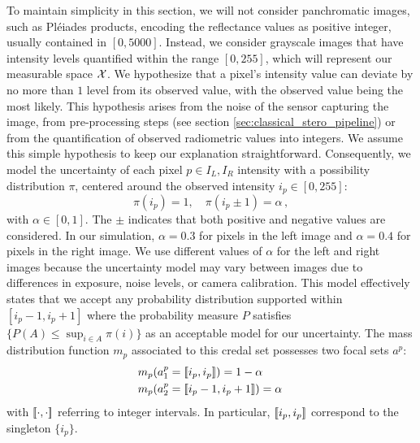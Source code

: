 To maintain simplicity in this section, we will not consider panchromatic images, such as Pléiades products, encoding the reflectance values as positive integer, usually contained in $[0, 5000]$. Instead, we consider grayscale images that have intensity levels quantified within the range $[0, 255]$, which will represent our measurable space ${\mathcal{X}}$. We hypothesize that a pixel's intensity value can deviate by no more than $1$ level from its observed value, with the observed value being the most likely. This hypothesis arises from the noise of the sensor capturing the image, from pre-processing steps (see section \ref{sec:classical_stero_pipeline}) or from the quantification of observed radiometric values into integers. We assume this simple hypothesis to keep our explanation straightforward. Consequently, we model the uncertainty of each pixel $p\in I_L,I_R$ intensity with a possibility distribution $\pi$, centered around the observed intensity $i_p\in[0,255]$:
\begin{equation}
    \pi(i_p)=1,\quad \pi(i_p\pm1)=\alpha\,,
\end{equation}\label{eq:pixel_possibility}
with $\alpha \in [0,1]$. The $\pm$ indicates that both positive and negative values are considered. In our simulation, $\alpha = 0.3$ for pixels in the left image and $\alpha = 0.4$ for pixels in the right image. We use different values of $\alpha$ for the left and right images because the uncertainty model may vary between images due to differences in exposure, noise levels, or camera calibration. This model effectively states that we accept any probability distribution supported within $[i_p - 1, i_p + 1]$ where the probability measure $P$ satisfies $\{P(A) \leq \sup_{i \in A} \pi(i)\}$ as an acceptable model for our uncertainty. The mass distribution function $m_p$ associated to this credal set possesses two focal sets $a^p$:
\begin{eqnarray}
    &m_p(a^p_1={[\![} i_p, i_p{]\!]})=1-\alpha\,\nonumber\\
    &m_p(a^p_2={[\![} i_p-1, i_p + 1{]\!]})=\alpha\,\label{eq:pixel_mass}
\end{eqnarray}
with ${[\![}\cdot, \cdot{]\!]}$ referring to integer intervals. In particular, ${[\![} i_p, i_p{]\!]}$ correspond to the singleton $\{i_p\}$.

